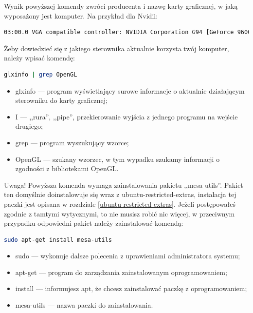 Wynik powyższej komendy zwróci producenta i nazwę karty graficznej, w jaką wyposażony jest komputer. Na przykład dla Nvidii:
\begin{lstlisting}[language=bash]
03:00.0 VGA compatible controller: NVIDIA Corporation G94 [GeForce 9600 GT] (rev a1)
\end{lstlisting}

Żeby dowiedzieć się z jakiego sterownika aktualnie korzysta twój komputer, należy wpisać komendę:

\begin{lstlisting}[language=bash]
glxinfo | grep OpenGL
\end{lstlisting}
\begin{itemize}
\item \textcolor{ubuntu_orange}{glxinfo} --- program wyświetlający surowe informacje o aktualnie działającym sterowniku do karty graficznej;
\item \textcolor{ubuntu_orange}{I} --- ,,rura'', ,,pipe'', przekierowanie wyjścia z jednego programu na wejście drugiego; 
\item \textcolor{ubuntu_orange}{grep} --- program wyszukujący wzorce;
\item \textcolor{ubuntu_orange}{OpenGL} --- szukany wzorzec, w tym wypadku szukamy informacji o zgodności z bibliotekami OpenGL.
\end{itemize}

Uwaga! Powyższa komenda wymaga zainstalowania pakietu ,,mesa-utils''. Pakiet ten domyślnie doinstalowuje się wraz z \textcolor{ubuntu_orange}{ubuntu-restricted-extras}, instalacja tej paczki jest opisana w rozdziale \ref{ubuntu-restricted-extras}. Jeżeli postępowałeś zgodnie z tamtymi wytycznymi, to nie musisz robić nic więcej, w przeciwnym przypadku odpowiedni pakiet należy zainstalować komendą:
\begin{lstlisting}[language=bash]
sudo apt-get install mesa-utils
\end{lstlisting}
\begin{itemize}
\item \textcolor{ubuntu_orange}{sudo} --- wykonuje dalsze polecenia z uprawieniami administratora systemu;
\item \textcolor{ubuntu_orange}{apt-get} --- program do zarządzania zainstalowanym oprogramowaniem;
\item \textcolor{ubuntu_orange}{install} --- informujesz apt, że chcesz zainstalować paczkę z oprogramowaniem;
\item \textcolor{ubuntu_orange}{mesa-utils} --- nazwa paczki do zainstalowania.
\end{itemize}

